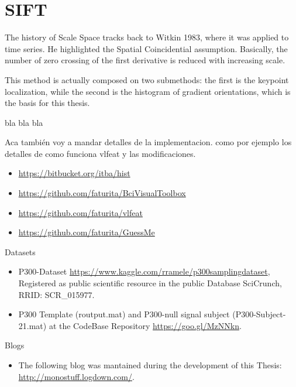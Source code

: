 \chapter{SIFT}

The history of Scale Space tracks back to Witkin 1983, where it was applied to time series.  He highlighted the Spatial Coincidential assumption.
Basically, the number of zero crossing of the first derivative is reduced with increasing scale.

\begin{story}

\end{story}

This method is actually composed on two submethods: the first is the keypoint localization, while the second is the histogram of gradient orientations, which is the basis for this thesis.

bla bla bla


Aca también voy a mandar detalles de la implementacion.   como por ejemplo los detalles de como funciona vlfeat y las modificaciones.

\begin{itemize}
\item \url{https://bitbucket.org/itba/hist}
\item \url{https://github.com/faturita/BciVisualToolbox}
\item \url{https://github.com/faturita/vlfeat}
\item \url{https://github.com/faturita/GuessMe}
\end{itemize}

Datasets

\begin{itemize}
\item P300-Dataset \url{https://www.kaggle.com/rramele/p300samplingdataset}, Registered as public scientific resource in the public Database SciCrunch, RRID: SCR\_015977. 
\item P300 Template (routput.mat) and P300-null signal subject (P300-Subject-21.mat) at the CodeBase Repository \url{https://goo.gl/MzNNkn}.
\end{itemize}

Blogs

\begin{itemize}
\item The following blog was mantained during the development of this Thesis: \url{http://monostuff.logdown.com/}.
\end{itemize}

